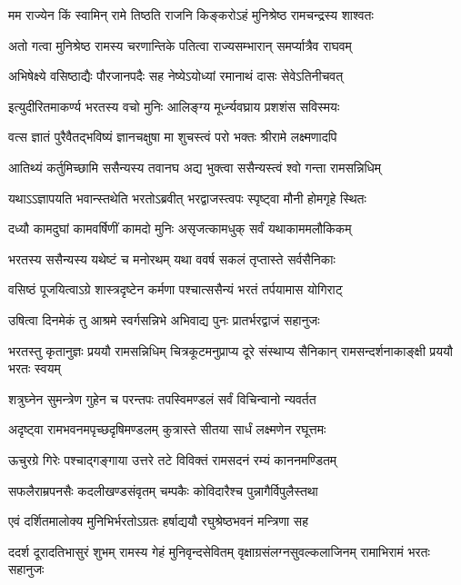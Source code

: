 \twolineshloka
{मम राज्येन किं स्वामिन् रामे तिष्ठति राजनि}
{किङ्करोऽहं मुनिश्रेष्ठ रामचन्द्रस्य शाश्वतः} %

\twolineshloka
{अतो गत्वा मुनिश्रेष्ठ रामस्य चरणान्तिके}
{पतित्वा राज्यसम्भारान् समर्प्यात्रैव राघवम्} %

\twolineshloka
{अभिषेक्ष्ये वसिष्ठाद्यैः पौरजानपदैः सह}
{नेष्येऽयोध्यां रमानाथं दासः सेवेऽतिनीचवत्} %

\twolineshloka
{इत्युदीरितमाकर्ण्य भरतस्य वचो मुनिः}
{आलिङ्ग्य मूर्ध्न्यवघ्राय प्रशशंस सविस्मयः} %

\twolineshloka
{वत्स ज्ञातं पुरैवैतद्भविष्यं ज्ञानचक्षुषा}
{मा शुचस्त्वं परो भक्तः श्रीरामे लक्ष्मणादपि} %

\twolineshloka
{आतिथ्यं कर्तुमिच्छामि ससैन्यस्य तवानघ}
{अद्य भुक्त्वा ससैन्यस्त्वं श्वो गन्ता रामसन्निधिम्} %

\twolineshloka
{यथाऽऽज्ञापयति भवान्स्तथेति भरतोऽब्रवीत्}
{भरद्वाजस्त्वपः स्पृष्ट्वा मौनी होमगृहे स्थितः} %

\twolineshloka
{दध्यौ कामदुघां कामवर्षिणीं कामदो मुनिः}
{असृजत्कामधुक् सर्वं यथाकाममलौकिकम्} %

\twolineshloka
{भरतस्य ससैन्यस्य यथेष्टं च मनोरथम्}
{यथा ववर्ष सकलं तृप्तास्ते सर्वसैनिकाः} %

\twolineshloka
{वसिष्ठं पूजयित्वाऽग्रे शास्त्रदृष्टेन कर्मणा}
{पश्चात्ससैन्यं भरतं तर्पयामास योगिराट्} %

\twolineshloka
{उषित्वा दिनमेकं तु आश्रमे स्वर्गसन्निभे}
{अभिवाद्य पुनः प्रातर्भरद्वाजं सहानुजः} %

\threelineshloka
{भरतस्तु कृतानुज्ञः प्रययौ रामसन्निधिम्}
{चित्रकूटमनुप्राप्य दूरे संस्थाप्य सैनिकान्}
{रामसन्दर्शनाकाङ्क्षी प्रययौ भरतः स्वयम्} %

\twolineshloka
{शत्रुघ्नेन सुमन्त्रेण गुहेन च परन्तपः}
{तपस्विमण्डलं सर्वं विचिन्वानो न्यवर्तत} %

\twolineshloka
{अदृष्ट्वा रामभवनमपृच्छदृषिमण्डलम्}
{कुत्रास्ते सीतया सार्धं लक्ष्मणेन रघूत्तमः} %

\twolineshloka
{ऊचुरग्रे गिरेः पश्चाद्गङ्गाया उत्तरे तटे}
{विविक्तं रामसदनं रम्यं काननमण्डितम्} %

\twolineshloka
{सफलैराम्रपनसैः कदलीखण्डसंवृतम्}
{चम्पकैः कोविदारैश्च पुन्नागैर्विपुलैस्तथा} %

\twolineshloka
{एवं दर्शितमालोक्य मुनिभिर्भरतोऽग्रतः}
{हर्षाद्ययौ रघुश्रेष्ठभवनं मन्त्रिणा सह} %

\fourlineindentedshloka
{ददर्श दूरादतिभासुरं शुभम्}
{रामस्य गेहं मुनिवृन्दसेवितम्}
{वृक्षाग्रसंलग्नसुवल्कलाजिनम्}
{रामाभिरामं भरतः सहानुजः} %


